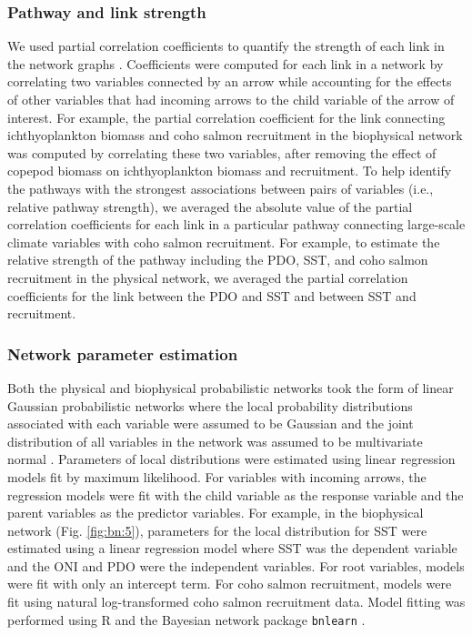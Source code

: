 \subsubsection{Pathway and link strength}

We used partial correlation coefficients to quantify the strength of each link
in the network graphs \citep{Zar1999a, Scutari2010, Yang2011}.  Coefficients
were computed for each link in a network by correlating two variables connected
by an arrow while accounting for the effects of other variables that had
incoming arrows to the child variable of the arrow of interest. For example, the
partial correlation coefficient for the link connecting ichthyoplankton biomass
and coho salmon recruitment in the biophysical network was computed by
correlating these two variables, after removing the effect of copepod biomass on
ichthyoplankton biomass and recruitment. To help identify the pathways with the
strongest associations between pairs of variables (i.e., relative pathway
strength), we averaged the absolute value of the partial correlation
coefficients for each link in a particular pathway connecting large-scale
climate variables with coho salmon recruitment.  For example, to estimate the
relative strength of the pathway including the PDO, SST, and coho salmon
recruitment in the physical network, we averaged the partial correlation
coefficients for the link between the PDO and SST and between SST and
recruitment.


\subsubsection{Network parameter estimation}

Both the physical and biophysical probabilistic networks took the form of linear
Gaussian probabilistic networks where the local probability distributions
associated with each variable were assumed to be Gaussian and the joint
distribution of all variables in the network was assumed to be multivariate
normal \citep{Shachter1989a, Koller2009a}. Parameters of local distributions
were estimated using linear regression models fit by maximum likelihood. For
variables with incoming arrows, the regression models were fit with the child
variable as the response variable and the parent variables as the predictor
variables. For example, in the biophysical network (Fig. \ref{fig:bn:5}),
parameters for the local distribution for SST were estimated using a linear
regression model where SST was the dependent variable and the ONI and PDO were
the independent variables. For root variables, models were fit with only an
intercept term. For coho salmon recruitment, models were fit using natural
log-transformed coho salmon recruitment data. Model fitting was performed using
R and the Bayesian network package \texttt{bnlearn} \citep{Scutari2010,
Rcore2013a}.

